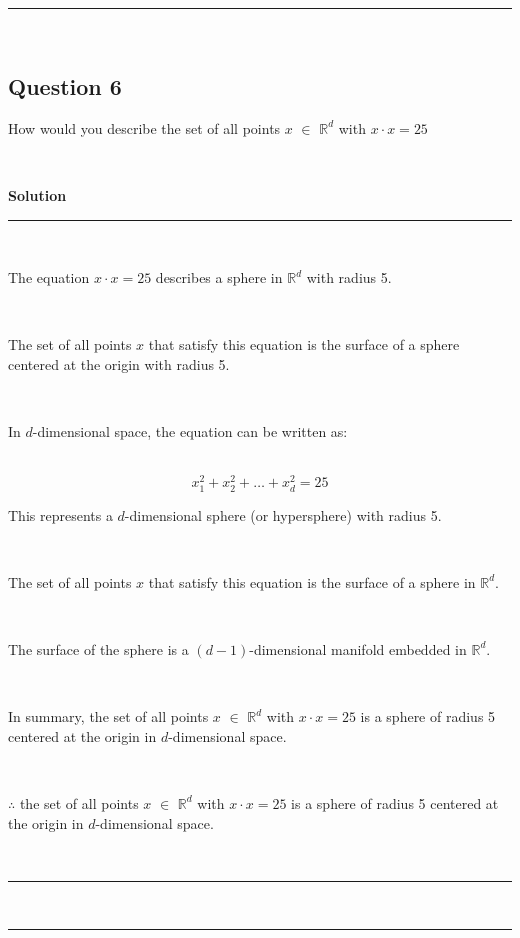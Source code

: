 \documentclass{article}
\begin{document}
\noindent\rule{\textwidth}{0.4pt}\\

\newpage
\subsection*{Question 6}
\parbox{\textwidth}{How would you describe the set of all points $x$ $\in$ $\mathbb{R}^d$ with $x \cdot x =25$}\\
\parbox{\textwidth}{\textbf{Solution}}
\noindent\rule{\textwidth}{0.4pt}\\
\parbox{\textwidth}{The equation $x \cdot x = 25$ describes a sphere in $\mathbb{R}^d$ with radius 5.}\\
\parbox{\textwidth}{The set of all points $x$ that satisfy this equation is the surface of a sphere centered at the origin with radius 5.}\\
\parbox{\textwidth}{In $d$-dimensional space, the equation can be written as:}\\
$$x_1^2 + x_2^2 + \ldots + x_d^2 = 25$$
\parbox{\textwidth}{This represents a $d$-dimensional sphere (or hypersphere) with radius 5.}\\
\parbox{\textwidth}{The set of all points $x$ that satisfy this equation is the surface of a sphere in $\mathbb{R}^d$.}\\
\parbox{\textwidth}{The surface of the sphere is a $(d-1)$-dimensional manifold embedded in $\mathbb{R}^d$.}\\
\parbox{\textwidth}{In summary, the set of all points $x$ $\in$ $\mathbb{R}^d$ with $x \cdot x = 25$ is a sphere of radius 5 centered at the origin in $d$-dimensional space.}\\
\parbox{\textwidth}{$\therefore$ the set of all points $x$ $\in$ $\mathbb{R}^d$ with $x \cdot x = 25$ is a sphere of radius 5 centered at the origin in $d$-dimensional space.}\\
\noindent\rule{\textwidth}{0.4pt}\\
\noindent\rule{\textwidth}{0.4pt}\\

\newpage
\end{document}
